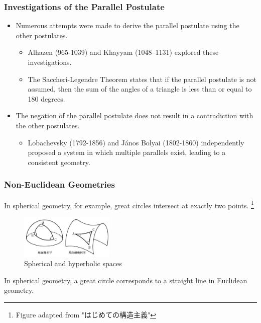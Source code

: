\documentclass[unicode, 14pt, aspectratio=169]{beamer}
\newcommand\blfootnote[1]{%
  \begingroup
  \renewcommand\thefootnote{}\footnote{#1}%
  \addtocounter{footnote}{-1}%
  \endgroup
}
\begin{document}
\begin{frame}
  \frametitle{Investigations of the Parallel Postulate}
  \begin{itemize}
  \item Numerous attempts were made to derive the parallel postulate using the other postulates.
    \begin{itemize}
    \item Alhazen (965-1039) and Khayyam (1048–1131) explored these investigations.
    \item The Saccheri-Legendre Theorem states that if the parallel postulate is not assumed, then the sum of the angles of a triangle is less than or equal to 180 degrees.
    \end{itemize}
  \item The negation of the parallel postulate does not result in a contradiction with the other postulates.
    \begin{itemize}
      \item Lobachevsky (1792-1856) and János Bolyai (1802-1860) independently proposed a system in which multiple parallels exist, leading to a consistent geometry.
    \end{itemize}
  \end{itemize}
\end{frame}
\begin{frame}
  \frametitle{Non-Euclidean Geometries}
  {\large In spherical geometry, for example, great circles intersect at exactly two points.}
  \blfootnote{Figure adapted from "はじめての構造主義"\supercite{structure}}
  \begin{figure}
    \includegraphics[width=0.4\textwidth]{images/non-euclid.png}
    \caption{Spherical and hyperbolic spaces}
  \end{figure}
  In spherical geometry, a great circle corresponds to a straight line in Euclidean geometry.
\end{frame}
\end{document}
